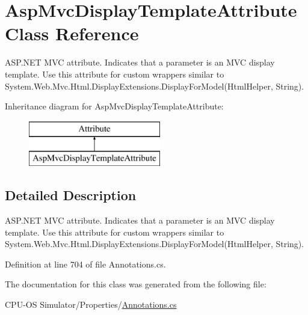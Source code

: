 \hypertarget{class_asp_mvc_display_template_attribute}{}\section{Asp\+Mvc\+Display\+Template\+Attribute Class Reference}
\label{class_asp_mvc_display_template_attribute}


A\+S\+P.\+N\+E\+T M\+V\+C attribute. Indicates that a parameter is an M\+V\+C display template. Use this attribute for custom wrappers similar to {\ttfamily System.\+Web.\+Mvc.\+Html.\+Display\+Extensions.\+Display\+For\+Model(\+Html\+Helper, String)}.  


Inheritance diagram for Asp\+Mvc\+Display\+Template\+Attribute\+:\begin{figure}[H]
\begin{center}
\leavevmode
\includegraphics[height=2.000000cm]{class_asp_mvc_display_template_attribute}
\end{center}
\end{figure}


\subsection{Detailed Description}
A\+S\+P.\+N\+E\+T M\+V\+C attribute. Indicates that a parameter is an M\+V\+C display template. Use this attribute for custom wrappers similar to {\ttfamily System.\+Web.\+Mvc.\+Html.\+Display\+Extensions.\+Display\+For\+Model(\+Html\+Helper, String)}. 



Definition at line 704 of file Annotations.\+cs.



The documentation for this class was generated from the following file\+:\begin{DoxyCompactItemize}
\item 
C\+P\+U-\/\+O\+S Simulator/\+Properties/\hyperlink{_annotations_8cs}{Annotations.\+cs}\end{DoxyCompactItemize}

